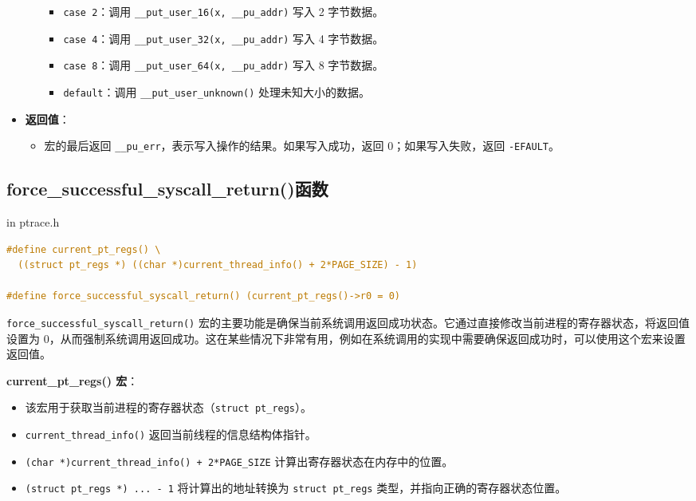 \documentclass[12pt,hyperref,a4paper,UTF8]{ctexart}
\begin{document}
\begin{itemize}
\begin{itemize}
\begin{itemize}
                        \item \lstinline|case 2|：调用 \lstinline|__put_user_16(x, __pu_addr)| 写入 2 字节数据。
                        \item \lstinline|case 4|：调用 \lstinline|__put_user_32(x, __pu_addr)| 写入 4 字节数据。
                        \item \lstinline|case 8|：调用 \lstinline|__put_user_64(x, __pu_addr)| 写入 8 字节数据。
                        \item \lstinline|default|：调用 \lstinline|__put_user_unknown()| 处理未知大小的数据。
                    \end{itemize}
          \end{itemize}
    \item \textbf{返回值}：
          \begin{itemize}
              \item 宏的最后返回 \lstinline|__pu_err|，表示写入操作的结果。如果写入成功，返回 0；如果写入失败，返回 \lstinline|-EFAULT|。
          \end{itemize}
\end{itemize}

\subsection{force\_successful\_syscall\_return()函数}

in ptrace.h

\begin{lstlisting}[language=C]
#define current_pt_regs() \
  ((struct pt_regs *) ((char *)current_thread_info() + 2*PAGE_SIZE) - 1)

#define force_successful_syscall_return() (current_pt_regs()->r0 = 0)
\end{lstlisting}

\lstinline|force_successful_syscall_return()| 宏的主要功能是确保当前系统调用返回成功状态。它通过直接修改当前进程的寄存器状态，将返回值设置为 0，从而强制系统调用返回成功。这在某些情况下非常有用，例如在系统调用的实现中需要确保返回成功时，可以使用这个宏来设置返回值。

\textbf{current\_pt\_regs() 宏}：

\begin{itemize}
    \item 该宏用于获取当前进程的寄存器状态（\lstinline|struct pt_regs|）。
    \item \lstinline|current_thread_info()| 返回当前线程的信息结构体指针。
    \item \lstinline|(char *)current_thread_info() + 2*PAGE_SIZE| 计算出寄存器状态在内存中的位置。
    \item \lstinline|(struct pt_regs *) ... - 1| 将计算出的地址转换为 \lstinline|struct pt_regs| 类型，并指向正确的寄存器状态位置。
\end{itemize}
\end{document}
